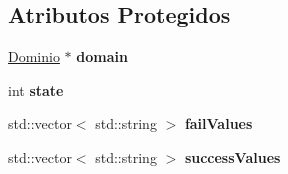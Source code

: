 \subsection*{Atributos Protegidos}
\begin{DoxyCompactItemize}
\item 
\hyperlink{classshibarides_1_1Dominio}{Dominio} $\ast$ {\bfseries domain}\hypertarget{classshibarides_1_1TUDominio_afbbf2e1d69e2a78b6d493521eb1a897f}{}\label{classshibarides_1_1TUDominio_afbbf2e1d69e2a78b6d493521eb1a897f}

\item 
int {\bfseries state}\hypertarget{classshibarides_1_1TUDominio_abfc3febebd253f31304997ea2715ac48}{}\label{classshibarides_1_1TUDominio_abfc3febebd253f31304997ea2715ac48}

\item 
std\+::vector$<$ std\+::string $>$ {\bfseries fail\+Values}\hypertarget{classshibarides_1_1TUDominio_ac1c9d98bd0e659ede32711ac693d6276}{}\label{classshibarides_1_1TUDominio_ac1c9d98bd0e659ede32711ac693d6276}

\item 
std\+::vector$<$ std\+::string $>$ {\bfseries success\+Values}\hypertarget{classshibarides_1_1TUDominio_a93df3635be9b1cd0726f5f1427a7b414}{}\label{classshibarides_1_1TUDominio_a93df3635be9b1cd0726f5f1427a7b414}

\end{DoxyCompactItemize}
